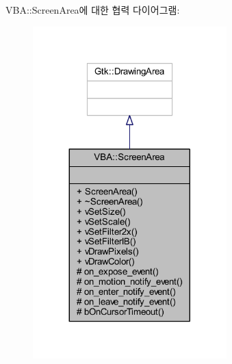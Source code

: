 V\+BA\+:\+:Screen\+Area에 대한 협력 다이어그램\+:\nopagebreak
\begin{figure}[H]
\begin{center}
\leavevmode
\includegraphics[width=212pt]{class_v_b_a_1_1_screen_area__coll__graph}
\end{center}
\end{figure}
